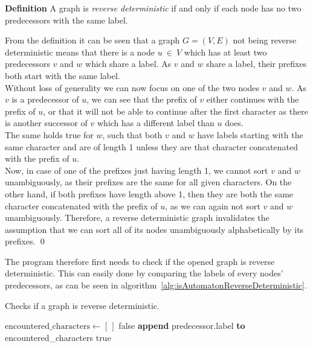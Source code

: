 \documentclass[a4paper,12pt,twoside,BCOR=10mm]{scrbook}
\begin{document}
\textbf{Definition} A graph is \textit{reverse deterministic} if and only if each node has no two predecessors with the same label.

From the definition it can be seen that a graph $ G = (V, E) $ not being reverse deterministic means that there
is a node $ u {\: \in \:} V $ which has at least two predecessors $ v $ and $ w $ which share a label.
As $ v $ and $ w $ share a label, their prefixes both start with the same label. \\
Without loss of generality we can now focus on one of the two nodes $ v $ and $ w $.
As $ v $ is a predecessor of $ u $, we can see that the
prefix of $ v $ either continues with the prefix of $ u $,
or that it will not be able to continue after the first character
as there is another successor of $ v $ which has a different label than $ u $ does. \\
The same holds true for $ w $, such that both $ v $ and $ w $ have labels starting
with the same character and are of length 1 unless they are that character concatenated
with the prefix of $ u $. \\
Now, in case of one of the prefixes just having length 1, we cannot sort $ v $ and $ w $
unambiguously, as their prefixes are the same for all given characters.
On the other hand, if both prefixes have length above 1, then they are both
the same character concatenated with the prefix of $ u $, as we can again not sort $ v $ and $ w $
unambiguously.
Therefore, a reverse deterministic graph invalidates the assumption that we can sort
all of its nodes unambiguously alphabetically by its prefixes. \qed

The program therefore first needs to check if the opened graph is reverse deterministic.
This can easily done by comparing the labels of every nodes' predecessors, as can be seen
in algorithm~\ref{alg:isAutomatonReverseDeterministic}.

\begin{algorithm}
\caption[Check if a graph is reverse deterministic]{Checks if a graph is reverse deterministic.}
\label{alg:isAutomatonReverseDeterministic}
\begin{algorithmic}[1]
	\State $ \textrm{encountered\_characters} \gets [ \, ] $
			\State \Return false
		\Else
			\State \textbf{append} predecessor.label \textbf{to} encountered\_characters
		\EndIf
	\EndFor
\EndFor
\State \Return true
\end{algorithmic}
\end{algorithm}
\end{document}
